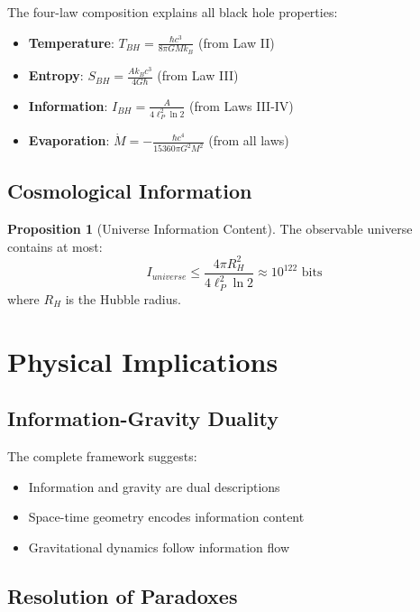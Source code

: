 \documentclass[11pt,a4paper]{article}
\theoremstyle{definition}
\newtheorem{proposition}[theorem]{Proposition}
\begin{document}
The four-law composition explains all black hole properties:

\begin{itemize}
\item \textbf{Temperature}: $T_{BH} = \frac{\hbar c^3}{8\pi G M k_B}$ (from Law II)
\item \textbf{Entropy}: $S_{BH} = \frac{A k_B c^3}{4G\hbar}$ (from Law III)
\item \textbf{Information}: $I_{BH} = \frac{A}{4\ell_P^2 \ln 2}$ (from Laws III-IV)
\item \textbf{Evaporation}: $\dot{M} = -\frac{\hbar c^4}{15360\pi G^2 M^2}$ (from all laws)
\end{itemize}

\subsection{Cosmological Information}

\begin{proposition}[Universe Information Content]
The observable universe contains at most:
\begin{equation}
I_{universe} \leq \frac{4\pi R_H^2}{4\ell_P^2 \ln 2} \approx 10^{122} \text{ bits}
\end{equation}
where $R_H$ is the Hubble radius.
\end{proposition}

\section{Physical Implications}

\subsection{Information-Gravity Duality}

The complete framework suggests:
\begin{itemize}
\item Information and gravity are dual descriptions
\item Space-time geometry encodes information content
\item Gravitational dynamics follow information flow
\end{itemize}

\subsection{Resolution of Paradoxes}
\end{document}
